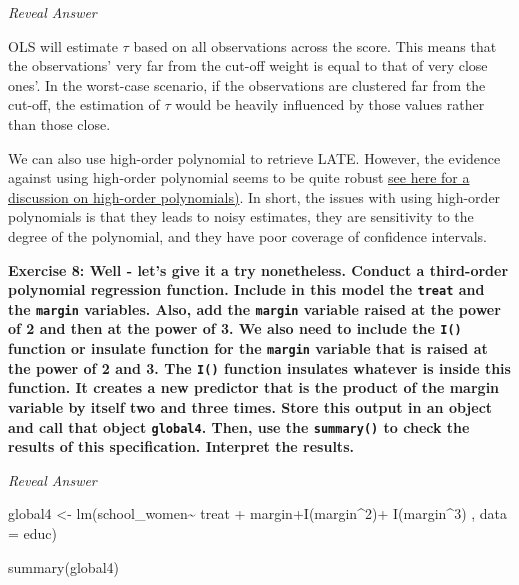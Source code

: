 \documentclass[
  letterpaper,
  DIV=11,
  numbers=noendperiod]{scrreprt}
\newenvironment{Shaded}{\begin{snugshade}}{\end{snugshade}}
\newcommand{\AttributeTok}[1]{\textcolor[rgb]{0.40,0.45,0.13}{#1}}
\newcommand{\DecValTok}[1]{\textcolor[rgb]{0.68,0.00,0.00}{#1}}
\newcommand{\FunctionTok}[1]{\textcolor[rgb]{0.28,0.35,0.67}{#1}}
\newcommand{\NormalTok}[1]{\textcolor[rgb]{0.00,0.23,0.31}{#1}}
\newcommand{\OtherTok}[1]{\textcolor[rgb]{0.00,0.23,0.31}{#1}}
\newcommand{\SpecialCharTok}[1]{\textcolor[rgb]{0.37,0.37,0.37}{#1}}
\begin{document}
\hfill\break

\emph{Reveal Answer}

\hfill\break

OLS will estimate \(\tau\) based on all observations across the score.
This means that the observations' very far from the cut-off weight is
equal to that of very close ones'. In the worst-case scenario, if the
observations are clustered far from the cut-off, the estimation of
\(\tau\) would be heavily influenced by those values rather than those
close.

\hfill\break

We can also use high-order polynomial to retrieve LATE. However, the
evidence against using high-order polynomial seems to be quite robust
\href{https://www.tandfonline.com/doi/abs/10.1080/07350015.2017.1366909}{see
here for a discussion on high-order polynomials)}. In short, the issues
with using high-order polynomials is that they leads to noisy estimates,
they are sensitivity to the degree of the polynomial, and they have poor
coverage of confidence intervals.

\textbf{Exercise 8: Well - let's give it a try nonetheless. Conduct a
third-order polynomial regression function. Include in this model the
\texttt{treat} and the \texttt{margin} variables. Also, add the
\texttt{margin} variable raised at the power of 2 and then at the power
of 3. We also need to include the \texttt{I()} function or insulate
function for the \texttt{margin} variable that is raised at the power of
2 and 3. The \texttt{I()} function insulates whatever is inside this
function. It creates a new predictor that is the product of the margin
variable by itself two and three times. Store this output in an object
and call that object \texttt{global4}. Then, use the \texttt{summary()}
to check the results of this specification. Interpret the results. }

\hfill\break

\emph{Reveal Answer}

\begin{Shaded}
\begin{Highlighting}[]
\NormalTok{global4 }\OtherTok{\textless{}{-}} \FunctionTok{lm}\NormalTok{(school\_women}\SpecialCharTok{\textasciitilde{}}\NormalTok{ treat }\SpecialCharTok{+}\NormalTok{ margin}\SpecialCharTok{+}\FunctionTok{I}\NormalTok{(margin}\SpecialCharTok{\^{}}\DecValTok{2}\NormalTok{)}\SpecialCharTok{+} \FunctionTok{I}\NormalTok{(margin}\SpecialCharTok{\^{}}\DecValTok{3}\NormalTok{) , }\AttributeTok{data =}\NormalTok{ educ)}

\FunctionTok{summary}\NormalTok{(global4)}
\end{Highlighting}
\end{Shaded}
\end{document}
